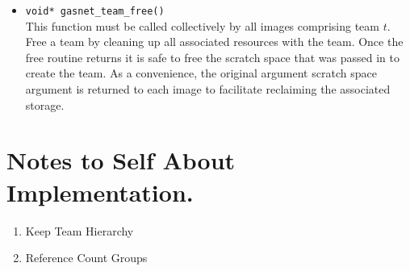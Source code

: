 \documentclass[times,10pt]{article}
\begin{document}
\begin{itemize}

\item \texttt{void* gasnet\_team\_free(\teamarg)} \\ 
This function must be called collectively by all images comprising team $t$.
Free a team by cleaning up all associated resources with the team. Once the
free routine returns it is safe to free the scratch space that was passed in
to create the team. As a convenience, the original argument scratch space
argument is returned to each image to facilitate reclaiming the associated storage.

\end{itemize}




\section{Notes to Self About Implementation.}
\begin{enumerate}
\item Keep Team Hierarchy
\item Reference Count Groups
\end{enumerate}
\end{document}
